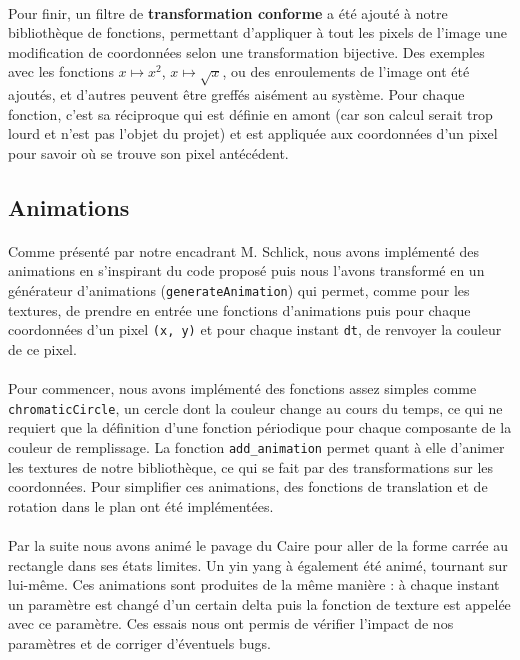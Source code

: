 \documentclass[a4paper]{article}
\begin{document}
\paragraph{}
Pour finir, un filtre de \textbf{transformation conforme} a été ajouté à notre bibliothèque de fonctions, permettant d'appliquer à tout les pixels de l'image une modification de coordonnées selon une transformation bijective. Des exemples avec les fonctions $x \mapsto x^2$, $x \mapsto \sqrt{x}$, ou des enroulements de l'image ont été ajoutés, et d'autres peuvent être greffés aisément au système. Pour chaque fonction, c'est sa réciproque qui est définie en amont (car son calcul serait trop lourd et n'est pas l'objet du projet) et est appliquée aux coordonnées d'un pixel pour savoir où se trouve son pixel antécédent.


\subsection{Animations}
\label{sec:animations}

\paragraph{}
Comme présenté par notre encadrant M. Schlick, nous avons implémenté des animations en s'inspirant du code proposé puis nous l'avons transformé en un générateur d'animations (\texttt{generateAnimation}) qui permet, comme pour les textures, de prendre en entrée une fonctions d'animations puis pour chaque coordonnées d'un pixel \texttt{(x, y)} et pour chaque instant \texttt{dt}, de renvoyer la couleur de ce pixel.

\paragraph{}
Pour commencer, nous avons implémenté des fonctions assez simples comme \texttt{chromaticCircle}, un cercle dont la couleur change au cours du temps, ce qui ne requiert que la définition d'une fonction périodique pour chaque composante de la couleur de remplissage. La fonction \texttt{add\_animation} permet quant à elle d'animer les textures de notre bibliothèque, ce qui se fait par des transformations sur les coordonnées. Pour simplifier ces animations, des fonctions de translation et de rotation dans le plan ont été implémentées.

\paragraph{}
Par la suite nous avons animé le pavage du Caire pour aller de la forme carrée au rectangle dans ses états limites. Un yin yang à également été animé, tournant sur lui-même. Ces animations sont produites de la même manière : à chaque instant un paramètre est changé d'un certain delta puis la fonction de texture est appelée avec ce paramètre. Ces essais nous ont permis de vérifier l'impact de nos paramètres et de corriger d'éventuels bugs.
\end{document}
